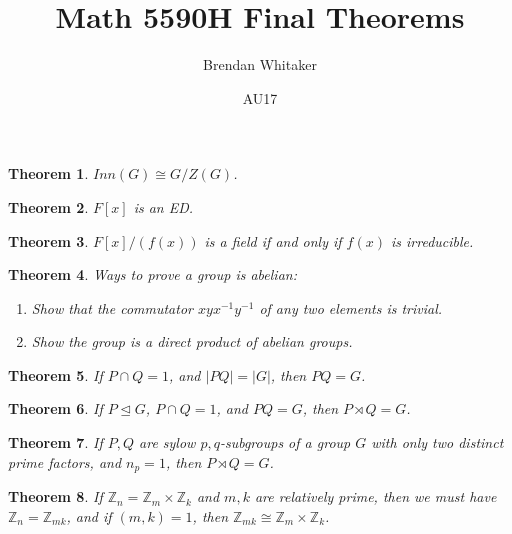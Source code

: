 \documentclass[10pt,oneside,reqno]{amsart}
\theoremstyle{plain}
\newtheorem{theorem}{Theorem}
\theoremstyle{definition}
\newcommand{\norm}{\trianglelefteq}
\newcommand{\semi}{\rtimes}
\newcommand{\z}{\mathbb{Z}}
\begin{document}
\title{Math 5590H Final Theorems}

\date{AU17}

\author[Brendan Whitaker]{Brendan Whitaker}

\maketitle

\begin{theorem}
$Inn(G) \cong G/Z(G)$. 
\end{theorem}

\begin{theorem}
$F[x]$ is an ED. 
\end{theorem}

\begin{theorem}
$F[x]/(f(x))$ is a field if and only if $f(x)$ is irreducible. 
\end{theorem}

\begin{theorem}
Ways to prove a group is abelian: 
\begin{enumerate}
\item Show that the commutator $xyx^{-1}y^{-1}$ of any two elements is trivial. 

\item Show the group is a direct product of abelian groups. 

\end{enumerate}
\end{theorem}

\begin{theorem}
If $P \cap Q = 1$, and $|PQ| = |G|$, then $PQ = G$. 
\end{theorem}

\begin{theorem}
If $P \norm G$, $P \cap Q = 1$, and $PQ = G$, then $P \semi Q = G$. 
\end{theorem}

\begin{theorem}
If $P,Q$ are sylow $p,q$-subgroups of a group $G$ with only two distinct prime factors, and $n_p = 1$, then $P \semi Q = G$. 
\end{theorem}

\begin{theorem}
If $\mathbb{Z}_n = \mathbb{Z}_m \times \mathbb{Z}_k$ and $m,k$ are relatively prime, then we must have $\mathbb{Z}_n = \mathbb{Z}_{mk}$, and if $(m,k) = 1$, then $\z_{mk} \cong \z_m \times \z_k$. 
\end{theorem}
\end{document}
